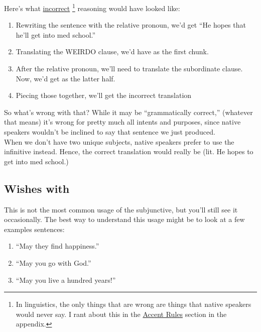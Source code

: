 Here's what \underline{incorrect} \footnote{In linguistics, the only things that are wrong are things that native speakers would never say. I rant about this in the \hyperref[subsec:accents]{Accent Rules} section in the appendix.} reasoning would have looked like: 
\begin{enumerate}
	\item Rewriting the sentence with the relative pronoun, we'd get ``He hopes that he'll get into med school.''
	\item Translating the WEIRDO clause, we'd have  as the first chunk.
	\item After the relative pronoun, we'll need to translate the subordinate clause. Now, we'd get  as the latter half.
	\item Piecing those together, we'll get the incorrect translation 
\end{enumerate}

So what's wrong with that? While it may be ``grammatically correct,'' (whatever that means) it's wrong for pretty much all intents and purposes, since native speakers wouldn't be inclined to say that sentence we just produced. \\

When we don't have two unique subjects, native speakers prefer to use the infinitive instead. Hence, the correct translation would really be  (lit. He hopes to get into med school.)\\

\subsection{Wishes with }

This is not the most common usage of the subjunctive, but you'll still see it occasionally. The best way to understand this usage might be to look at a few examples sentences:

\begin{enumerate}[noitemsep]
	\item ``May they find happiness.'' \arr {}
	\item ``May you go with God.'' \arr {}
	\item ``May you live a hundred years!'' \arr {}
\end{enumerate}

